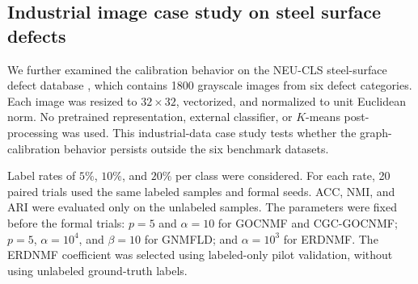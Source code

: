 \documentclass[11pt]{article}
\theoremstyle{remark}
\begin{document}
\subsection{Industrial image case study on steel surface defects}

We further examined the calibration behavior on the NEU-CLS steel-surface defect database \cite{Song2013NEU}, which contains 1800 grayscale images from six defect categories. Each image was resized to $32\times32$, vectorized, and normalized to unit Euclidean norm. No pretrained representation, external classifier, or $K$-means post-processing was used. This industrial-data case study tests whether the graph-calibration behavior persists outside the six benchmark datasets.

Label rates of $5\%$, $10\%$, and $20\%$ per class were considered. For each rate, 20 paired trials used the same labeled samples and formal seeds. ACC, NMI, and ARI were evaluated only on the unlabeled samples. The parameters were fixed before the formal trials: $p=5$ and $\alpha=10$ for GOCNMF and CGC-GOCNMF; $p=5$, $\alpha=10^4$, and $\beta=10$ for GNMFLD; and $\alpha=10^3$ for ERDNMF. The ERDNMF coefficient was selected using labeled-only pilot validation, without using unlabeled ground-truth labels.
\end{document}
